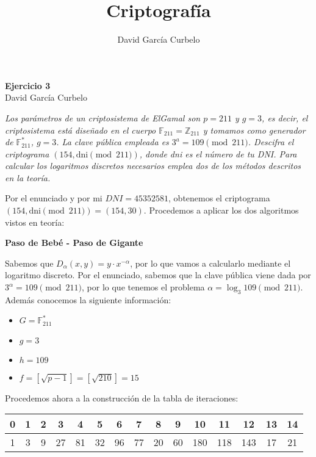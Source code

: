 \documentclass[fleqn]{article}
\author{David García Curbelo}
\title{Criptografía}
\def\Z{\mathds{Z}}
\def\F{\mathds{F}}
\begin{document}
    \begin{center}
        \LARGE{\textbf{Ejercicio 3}} \\
        \Large{David García Curbelo} 
    \end{center}

    \vspace{1cm}     

    \textit{Los parámetros de un criptosistema de ElGamal son $p = 211$ y 
    $g = 3$, es decir, el criptosistema está diseñado en el cuerpo $\F_{211} = \Z_{211}$ y tomamos
    como generador de $\F_{211}^*$, $g = 3$. La clave pública empleada es $3^a = 109 \pmod{211}$.
    Descifra el criptograma $(154, \text{dni} \pmod{211})$, donde dni es el número de tu DNI. Para 
    calcular los logaritmos discretos necesarios emplea dos de los métodos descritos en la teoría.} 

    \vspace{0.5cm}   
        
    Por el enunciado y por mi $DNI = 45352581$, obtenemos el criptograma $(154, \text{dni} \pmod{211}) 
    = (154, 30)$. Procedemos a aplicar los dos algoritmos vistos en teoría:
    \begin{center}
        \large{\textbf{Paso de Bebé - Paso de Gigante}}  
    \end{center}

    Sabemos que $D_\alpha (x, y) = y \cdot x^{-\alpha}$, por lo que vamos a calcularlo mediante el 
    logaritmo discreto. Por el enunciado, sabemos que la clave pública viene dada por $3^\alpha = 109 \pmod{211}$,
    por lo que tenemos el problema $\alpha = \log_3 109 \pmod{211}$. Además conocemos la siguiente información:
    \begin{itemize}
        \item $G = \F_{211}^*$
        \item $g = 3$
        \item $h = 109$
        \item $f = [\sqrt{p-1}] = [\sqrt{210}] = 15$
    \end{itemize}

    Procedemos ahora a la construcción de la tabla de iteraciones:

    \begin{center}
        \begin{tabular}{|c c c c c c c c c c c c c c c|} \hline
            0 & 1 & 2 & 3  & 4  & 5  & 6  & 7  & 8  & 9  & 10  & 11  & 12  & 13 & 14 \\ \hline
            1 & 3 & 9 & 27 & 81 & 32 & 96 & 77 & 20 & 60 & 180 & 118 & 143 & 17 & 21 \\ \hline
        \end{tabular}
    \end{center}
\end{document}
